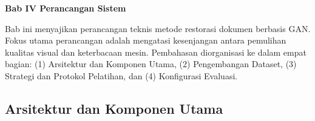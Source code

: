 \documentclass[12pt,a4paper]{article}
\begin{document}
\sloppy %
\onehalfspacing %



\vspace{2cm}
\begin{center}
  {\fontsize{14}{16.8}\selectfont\textbf{Bab IV \qquad Perancangan Sistem}}
\end{center}


\renewcommand{\thesection}{\Roman{section}}
\renewcommand{\thesubsection}{\thesection.\arabic{subsection}}
\renewcommand{\thesubsubsection}{\thesubsection.\arabic{subsubsection}}


\renewcommand{\thetable}{\thesection.\arabic{table}}

\renewcommand{\thefigure}{\thesection.\arabic{figure}}

\renewcommand{\theequation}{\thesection.\arabic{equation}}

\setcounter{section}{4}
\setcounter{subsection}{0}
\setcounter{table}{0}
\setcounter{figure}{0}
\label{sec:perancangan-implementasi}

Bab ini menyajikan perancangan teknis metode restorasi dokumen berbasis GAN. Fokus utama perancangan adalah mengatasi kesenjangan antara pemulihan kualitas visual dan keterbacaan mesin. Pembahasan diorganisasi ke dalam empat bagian: (1) Arsitektur dan Komponen Utama, (2) Pengembangan Dataset, (3) Strategi dan Protokol Pelatihan, dan (4) Konfigurasi Evaluasi.

\subsection{Arsitektur dan Komponen Utama}
\label{subsec:arsitektur-komponen-utama}
\end{document}
